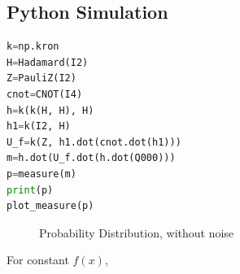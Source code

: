 \documentclass{article}
\begin{document}
\subsection{Python Simulation}
\begin{lstlisting}[language=Python, frame=single]
k=np.kron
H=Hadamard(I2)
Z=PauliZ(I2)
cnot=CNOT(I4)
h=k(k(H, H), H)
h1=k(I2, H)
U_f=k(Z, h1.dot(cnot.dot(h1)))
m=h.dot(U_f.dot(h.dot(Q000)))
p=measure(m)
print(p)
plot_measure(p)
\end{lstlisting}
\begin{figure}[H]
\centering 
\noindent{}%
\caption{Probability Distribution, without noise}
\end{figure}
For constant $f(x)$,
\end{document}
